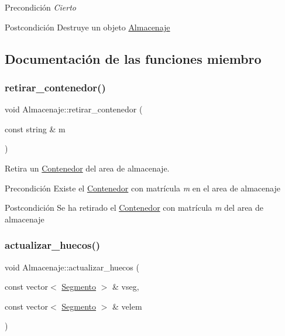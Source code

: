 \begin{DoxyPrecond}{Precondición}
{\itshape Cierto} 
\end{DoxyPrecond}
\begin{DoxyPostcond}{Postcondición}
Destruye un objeto \hyperlink{class_almacenaje}{Almacenaje} 
\end{DoxyPostcond}


\subsection{Documentación de las funciones miembro}
\mbox{\label{class_almacenaje_aa4a16321fcfba32873521b9af6c8b73a}} 
\subsubsection{\texorpdfstring{retirar\+\_\+contenedor()}{retirar\_contenedor()}}
{\footnotesize\ttfamily void Almacenaje\+::retirar\+\_\+contenedor (\begin{DoxyParamCaption}\item[{const string \&}]{m }\end{DoxyParamCaption})}



Retira un \hyperlink{class_contenedor}{Contenedor} del area de almacenaje. 

\begin{DoxyPrecond}{Precondición}
Existe el \hyperlink{class_contenedor}{Contenedor} con matrícula {\itshape m} en el area de almacenaje 
\end{DoxyPrecond}
\begin{DoxyPostcond}{Postcondición}
Se ha retirado el \hyperlink{class_contenedor}{Contenedor} con matrícula {\itshape m} del area de almacenaje 
\end{DoxyPostcond}
\mbox{\label{class_almacenaje_af91b0be022140b41af913728dd045e35}} 
\subsubsection{\texorpdfstring{actualizar\+\_\+huecos()}{actualizar\_huecos()}}
{\footnotesize\ttfamily void Almacenaje\+::actualizar\+\_\+huecos (\begin{DoxyParamCaption}\item[{const vector$<$ \hyperlink{class_segmento}{Segmento} $>$ \&}]{vseg,  }\item[{const vector$<$ \hyperlink{class_segmento}{Segmento} $>$ \&}]{velem }\end{DoxyParamCaption})}



